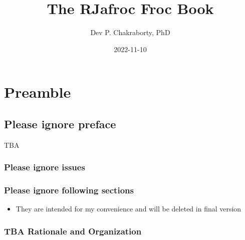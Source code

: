 \documentclass[
]{book}
\title{The RJafroc Froc Book}
\author{Dev P. Chakraborty, PhD}
\date{2022-11-10}
\providecommand{\tightlist}{%
  \setlength{\itemsep}{0pt}\setlength{\parskip}{0pt}}
\begin{document}
\maketitle

{
\setcounter{tocdepth}{1}
\tableofcontents
}
\hypertarget{part-preamble}{%
\part*{Preamble}\label{part-preamble}}

\hypertarget{please-ignore-preface}{%
\chapter{Please ignore preface}\label{please-ignore-preface}}

TBA

\hypertarget{please-ignore-issues}{%
\section{Please ignore issues}\label{please-ignore-issues}}

\hypertarget{please-ignore-following-sections}{%
\section{Please ignore following sections}\label{please-ignore-following-sections}}

\begin{itemize}
\tightlist
\item
  They are intended for my convenience and will be deleted in final version
\end{itemize}

\hypertarget{tba-rationale-and-organization}{%
\section{TBA Rationale and Organization}\label{tba-rationale-and-organization}}
\end{document}
